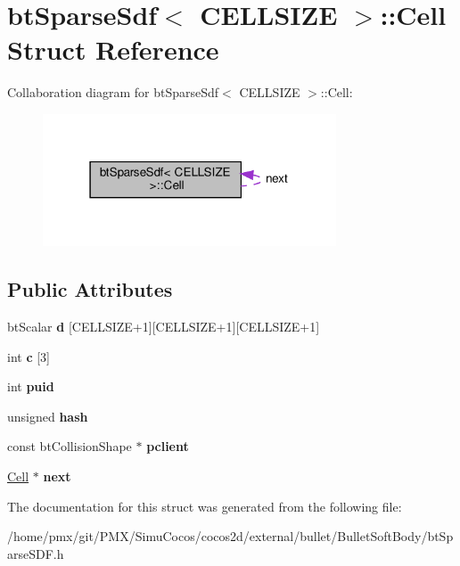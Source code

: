 \hypertarget{structbtSparseSdf_1_1Cell}{}\section{bt\+Sparse\+Sdf$<$ C\+E\+L\+L\+S\+I\+ZE $>$\+:\+:Cell Struct Reference}
\label{structbtSparseSdf_1_1Cell}


Collaboration diagram for bt\+Sparse\+Sdf$<$ C\+E\+L\+L\+S\+I\+ZE $>$\+:\+:Cell\+:
\nopagebreak
\begin{figure}[H]
\begin{center}
\leavevmode
\includegraphics[width=247pt]{structbtSparseSdf_1_1Cell__coll__graph}
\end{center}
\end{figure}
\subsection*{Public Attributes}
\begin{DoxyCompactItemize}
\item 
\mbox{\label{structbtSparseSdf_1_1Cell_a67b650b7a70623b8e84f26bcbfb4c4de}} 
bt\+Scalar {\bfseries d} \mbox{[}C\+E\+L\+L\+S\+I\+ZE+1\mbox{]}\mbox{[}C\+E\+L\+L\+S\+I\+ZE+1\mbox{]}\mbox{[}C\+E\+L\+L\+S\+I\+ZE+1\mbox{]}
\item 
\mbox{\label{structbtSparseSdf_1_1Cell_a3d48e2ebb4a8ff208de9601eb5ec175a}} 
int {\bfseries c} \mbox{[}3\mbox{]}
\item 
\mbox{\label{structbtSparseSdf_1_1Cell_afc8df81da8cb09983eb3ca7e44f06398}} 
int {\bfseries puid}
\item 
\mbox{\label{structbtSparseSdf_1_1Cell_a636da43bb3d3330fe69589d963224773}} 
unsigned {\bfseries hash}
\item 
\mbox{\label{structbtSparseSdf_1_1Cell_a2846059ca6c191326bf6897ed577130d}} 
const bt\+Collision\+Shape $\ast$ {\bfseries pclient}
\item 
\mbox{\label{structbtSparseSdf_1_1Cell_a1e8acdc986350cbd35cebba46b55c22d}} 
\hyperlink{structbtSparseSdf_1_1Cell}{Cell} $\ast$ {\bfseries next}
\end{DoxyCompactItemize}


The documentation for this struct was generated from the following file\+:\begin{DoxyCompactItemize}
\item 
/home/pmx/git/\+P\+M\+X/\+Simu\+Cocos/cocos2d/external/bullet/\+Bullet\+Soft\+Body/bt\+Sparse\+S\+D\+F.\+h\end{DoxyCompactItemize}
